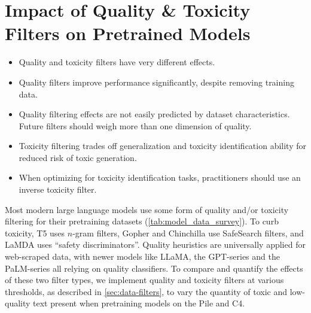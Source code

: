 \documentclass{article}
\begin{document}
\vspace{-3mm}
\section{Impact of Quality \& Toxicity Filters on Pretrained Models}
\label{sec:quality-toxicity}

\begin{tcolorbox}[width=\textwidth,title={Section Findings}] %
\vspace{-2mm}
\begin{itemize}[itemsep=0pt, wide=3pt]
    \item Quality and toxicity filters have very different effects.
    \item Quality filters improve performance significantly, despite removing training data.
    \item Quality filtering effects are not easily predicted by dataset characteristics. Future filters should weigh more than one dimension of quality.
    \item Toxicity filtering trades off generalization and toxicity identification ability for reduced risk of toxic generation.
    \item When optimizing for toxicity identification tasks, practitioners should use an inverse toxicity filter.
\end{itemize}
\end{tcolorbox}

Most modern large language models use some form of quality and/or toxicity filtering for their pretraining datasets (\cref{tab:model_data_survey}).
To curb toxicity, T5 uses $n$-gram filters, Gopher and Chinchilla use SafeSearch filters, and LaMDA uses ``safety discriminators''.
Quality heuristics are universally applied for web-scraped data, with newer models like LLaMA, the GPT-series and the PaLM-series all relying on quality classifiers.
To compare and quantify the effects of these two filter types, we implement quality and toxicity filters at various thresholds, as described in \cref{sec:data-filters}, to vary the quantity of toxic and low-quality text present when pretraining models on the Pile and C4.
\end{document}

